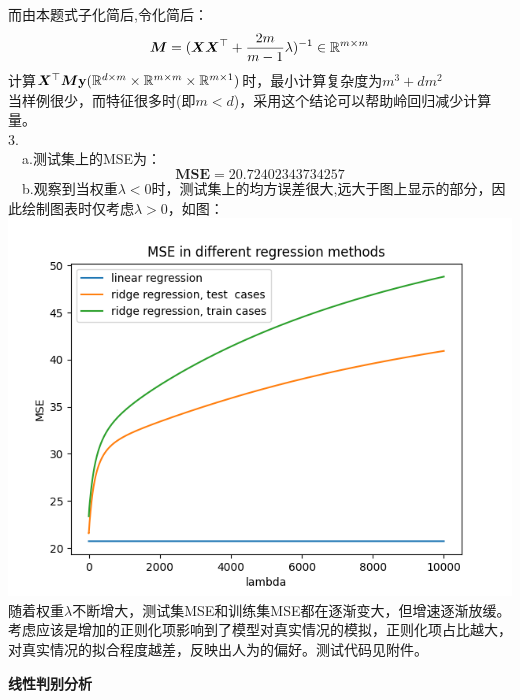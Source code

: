 \documentclass[answers]{exam}  %
\begin{document}
\begin{questions}
\begin{solution}
		而由本题式子化简后,令化简后：
		$$\boldsymbol{M}=(\boldsymbol{X}\boldsymbol{X}^\top +\frac{2m}{m-1}\lambda)^{-1}\in\mathbb R^{m\times m}$$
		计算$\boldsymbol{X}^\top\boldsymbol{M}\mathbf y(\mathbb R^{d\times m}\times \mathbb R^{m\times m}\times \mathbb R^{m\times 1})$时，最小计算复杂度为$m^3+dm^2$\\
		当样例很少，而特征很多时(即$m<d$)，采用这个结论可以帮助岭回归减少计算量。
		\\3.\\
		$\mathsf{\quad}$a.测试集上的MSE为：
		$$\mathbf{MSE} = 20.72402343734257$$
		$\mathsf{\quad}$b.观察到当权重$\lambda<0$时，测试集上的均方误差很大,远大于图上显示的部分，因此绘制图表时仅考虑$\lambda>0$，如图：\\
		\includegraphics[]{Figure_1.png}\\
		 随着权重$\lambda$不断增大，测试集MSE和训练集MSE都在逐渐变大，但增速逐渐放缓。考虑应该是增加的正则化项影响到了模型对真实情况的模拟，正则化项占比越大，对真实情况的拟合程度越差，反映出人为的偏好。测试代码见附件。
	\end{solution}
\question [20] \textbf{线性判别分析}


\end{questions}
\end{document}
